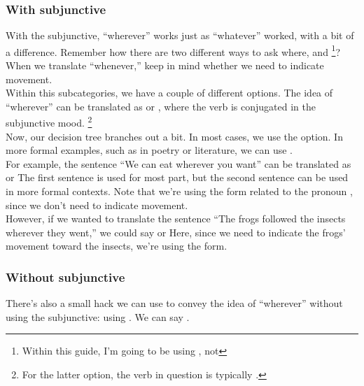 \subsubsection{With subjunctive}
With the subjunctive, ``wherever'' works just as ``whatever'' worked, with a bit of a difference. Remember how there are two different ways to ask where,  and \footnote{Within this guide, I'm going to be using , not }? When we translate ``whenever,'' keep in mind whether we need to indicate movement. \\

Within this subcategories, we have a couple of different options. 
The idea of ``wherever'' can be translated as  or , where the verb is conjugated in the subjunctive mood. \footnote{For the latter option, the verb in question is typically .} \\

Now, our decision tree branches out a bit. In most cases, we use the  option. In more formal examples, such as in poetry or literature, we can use . \\

For example, the sentence ``We can eat wherever you want'' can be translated as  or  The first sentence is used for most part, but the second sentence can be used in more formal contexts. Note that we're using the form related to the pronoun , since we don't need to indicate movement. \\

However, if we wanted to translate the sentence ``The frogs followed the insects wherever they went,'' we could say  or  Here, since we need to indicate the frogs' movement toward the insects, we're using the  form. 

\subsubsection{Without subjunctive}
There's also a small hack we can use to convey the idea of ``wherever'' without using the subjunctive: using \hyperref[subsec:cualquier]{}. We can say . 

